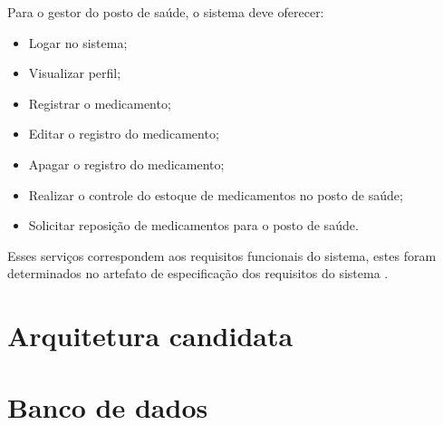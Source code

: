  Para o gestor do posto de saúde, o sistema deve oferecer:
 
 \begin{itemize}
     \item Logar no sistema;
     \item Visualizar perfil;
     \item Registrar o medicamento;
     \item Editar o registro do medicamento;
     \item Apagar o registro do medicamento;
     \item Realizar o controle do estoque de medicamentos no posto de saúde;
     \item Solicitar reposição de medicamentos para o posto de saúde.
 \end{itemize}
 
 Esses serviços correspondem aos requisitos funcionais do sistema, estes foram determinados no artefato de especificação dos requisitos do sistema .

\section{Arquitetura candidata}
\section{Banco de dados}